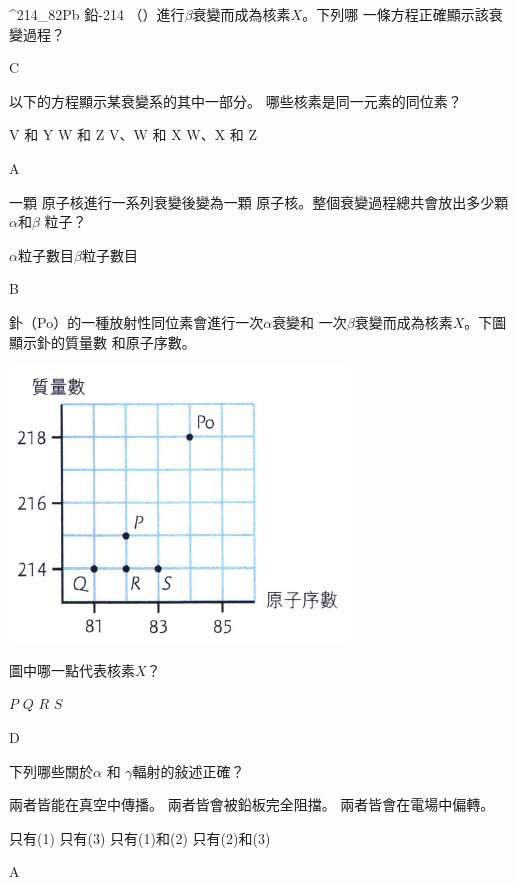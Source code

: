 {
    \def\tempf\ce{^{214}_{82}Pb}
    鉛-214 （）進行$\beta$衰變而成為核素$X$。下列哪 一條方程正確顯示該衰變過程？
    \begin{tasks}
        \task {}
        \task {}
        \task {}
        \task {}
    \end{tasks}
}{C}

{
以下的方程顯示某衰變系的其中一部分。
哪些核素是同一元素的同位素？
\begin{tasks}
    \task V 和 Y
    \task W 和 Z
    \task V、W 和 X
    \task W、X 和 Z
\end{tasks}

}{A}

{
    一顆  原子核進行一系列衰變後變為一顆  原子核。整個衰變過程總共會放出多少顆$\alpha$和$\beta$ 粒子？
    \begin{tasks}
        \task [] $\alpha$粒子數目\tab $\beta$粒子數目
         
    \end{tasks}
}{B}

{
    釙（Po）的一種放射性同位素會進行一次$\alpha$衰變和 一次$\beta$衰變而成為核素$X$。下圖顯示釙的質量數 和原子序數。
    \par{\par\centering\includegraphics[width=.3\textwidth]{./img/ch1_prop_mc_2024-06-17-21-50-56.png}\par}
    圖中哪一點代表核素$X$？
    \begin{tasks}
        \task $P$
        \task $Q$
        \task $R$
        \task $S$
    \end{tasks}

}{D}

{
    下列哪些關於$\alpha$ 和 $\gamma$輻射的敍述正確？
    \begin{statements}
        \task 兩者皆能在真空中傳播。
        \task 兩者皆會被鉛板完全阻擋。
        \task 兩者皆會在電場中偏轉。
    \end{statements}
    \begin{tasks}
        \task 只有(1)
        \task 只有(3)
        \task 只有(1)和(2)
        \task 只有(2)和(3)
    \end{tasks}
}{A}

